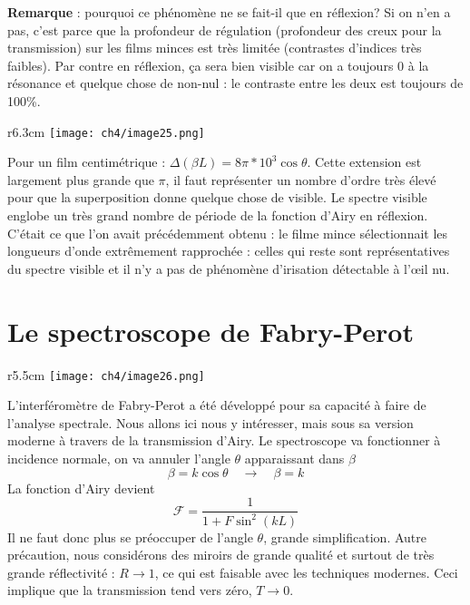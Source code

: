 \newpage
\textbf{Remarque} : pourquoi ce phénomène ne se fait-il que en réflexion? Si on n'en a pas, c'est 
parce que la profondeur de régulation (profondeur des creux pour la transmission) sur les films 
minces est très limitée (contrastes d'indices très faibles). Par contre en réflexion, ça sera 
bien visible car on a toujours 0 à la résonance et quelque chose de non-nul : le contraste entre 
les deux est toujours de 100\%.\\

	\begin{wrapfigure}[9]{r}{6.3cm}
	\vspace{-8mm}
	\texttt{[image: ch4/image25.png]}
	\end{wrapfigure}
Pour un film centimétrique : $\Delta(\beta L) = 8\pi*10^3\cos\theta$. Cette extension est largement 
plus grande que $\pi$, il faut représenter un nombre d'ordre très élevé pour que la superposition 
donne quelque chose de visible. Le spectre visible englobe un très grand nombre de période de la 
fonction d'Airy en réflexion. C'était ce que l'on avait précédemment obtenu : le filme mince 
sélectionnait les longueurs d'onde extrêmement rapprochée : celles qui reste sont représentatives 
du spectre visible et il n'y a pas de phénomène d'irisation détectable à l’œil nu.


\newpage
\section{Le spectroscope de Fabry-Perot}
	\begin{wrapfigure}[13]{r}{5.5cm}
	\vspace{-8mm}
	\texttt{[image: ch4/image26.png]}
	\end{wrapfigure}
L'interféromètre de Fabry-Perot a été développé pour sa capacité à faire de l'analyse spectrale. 
Nous allons ici nous y intéresser, mais sous sa version moderne à travers de la transmission d'Airy. 
Le spectroscope va fonctionner à incidence normale, on va annuler l'angle $\theta$ apparaissant dans 
$\beta$
\begin{equation}
\beta = k\cos\theta \quad\rightarrow\quad \beta = k
\end{equation}
La fonction d'Airy devient
\begin{equation}
\mathcal{F} = \dfrac{1}{1+F\sin^2(kL)}
\end{equation}
Il ne faut donc plus se préoccuper de l'angle $\theta$, grande simplification. Autre précaution, 
nous considérons des miroirs de grande qualité et surtout de très grande réflectivité : $
R\rightarrow 1$, ce qui est faisable avec les techniques modernes. Ceci implique que la 
transmission tend vers zéro, $T\rightarrow0$.\\

